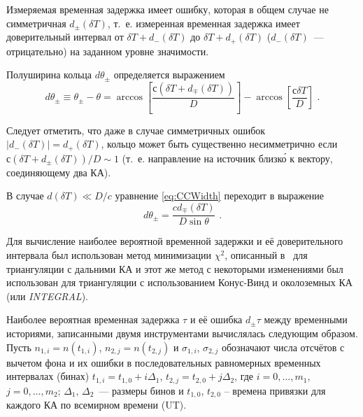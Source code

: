 Измеряемая временная задержка имеет ошибку, которая в общем случае 
не симметричная $d_{\pm}(\delta T)$, т.~е. измеренная временная задержка имеет 
доверительный интервал от $\delta T + d_{-}(\delta T)$ 
до $\delta T + d_{+}(\delta T)$ ($d_{-}(\delta T)$~--- отрицательно) на заданном уровне значимости.

Полуширина кольца $d\theta_{\pm}$ определяется выражением
\begin{equation}\label{eq:CCWidth}
d\theta_{\pm} \equiv \theta_{\pm} -\theta = 
\arccos \left[ \frac{с (\delta T + d_{\mp}(\delta T))}{D} \right] - \arccos\left[ \frac{с \delta T}{D} \right]\mbox{ .}
\end{equation}

Следует отметить, что даже в случае симметричных ошибок $|d_{-}(\delta T)| = d_{+}(\delta T)$, 
кольцо может быть существенно несимметрично если $с (\delta T + d_{\pm}(\delta T))/D \sim 1$ 
(т.~е. направление на источник близк\'{о} к вектору, соединяющему два КА).

В случае $d(\delta T) \ll D/c$ уравнение \ref{eq:CCWidth} переходит в выражение
\begin{equation}\label{eq:CCWidthRed}
d \theta_{\pm} = \frac{c d_{\mp}(\delta T)}{D\sin \theta} \mbox{ .}
\end{equation}

Для вычисление наиболее вероятной временной задержки и её доверительного интервала 
был использован метод минимизации $\chi^2$, описанный в~\citep{Hurley_1999ApJSa} 
для триангуляции с дальними КА и этот же метод с некоторыми изменениями был 
использован для триангуляции с использованием Конус-Винд и околоземных КА (или \textit{INTEGRAL}).

Наиболее вероятная временная задержка $\tau$ и её ошибка $d_{\pm}\tau$ между 
временными историями, записанными двумя инструментами вычислялась следующим образом. 
Пусть $n_{1,i} = n(t_{1,i})$, $n_{2,j} = n(t_{2,j})$ и 
$\sigma_{1,i}$, $\sigma_{2,j}$ обозначают числа отсчётов с вычетом фона 
и их ошибки в последовательных равномерных временных интервалах (бинах) 
$t_{1,i} = t_{1,0} + i\Delta_{1}$, $t_{2,j} = t_{2,0} + j\Delta_{2}$, 
где $i = 0,\dotsc,m_1$, $j = 0,\dotsc,m_2$; $\Delta_{1}$, 
$\Delta_{2}$~--- размеры бинов и $t_{1,0}$, $t_{2,0}$ -- времена привязки для каждого КА по всемирном времени (UT).

